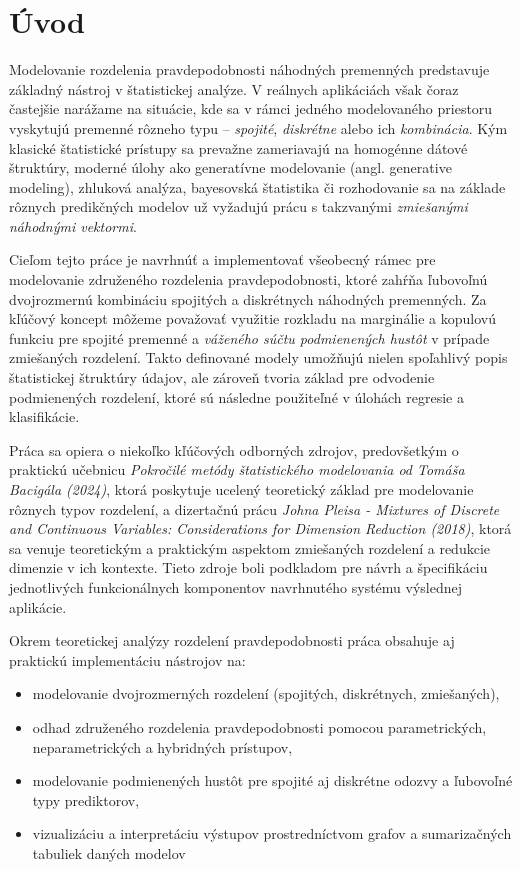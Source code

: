 \chapter{Úvod}

Modelovanie rozdelenia pravdepodobnosti náhodných premenných predstavuje základný nástroj v štatistickej analýze. V reálnych aplikáciách však čoraz častejšie narážame na situácie, kde sa v rámci jedného modelovaného priestoru vyskytujú premenné rôzneho typu – \textit{spojité}, \textit{diskrétne} alebo ich \textit{kombinácia}. Kým klasické štatistické prístupy sa prevažne zameriavajú na homogénne dátové štruktúry, moderné úlohy ako generatívne modelovanie (angl. generative modeling), zhluková analýza, bayesovská štatistika či rozhodovanie sa na základe rôznych predikčných modelov už vyžadujú prácu s takzvanými \textit{zmiešanými náhodnými vektormi}.

Cieľom tejto práce je navrhnúť a implementovať všeobecný rámec pre modelovanie združeného rozdelenia pravdepodobnosti, ktoré zahŕňa ľubovoľnú dvojrozmernú kombináciu spojitých a diskrétnych náhodných premenných. Za kľúčový koncept môžeme považovať využitie rozkladu na marginálie a kopulovú funkciu pre spojité premenné a \textit{váženého súčtu podmienených hustôt} v prípade zmiešaných rozdelení. Takto definované modely umožňujú nielen spoľahlivý popis štatistickej štruktúry údajov, ale zároveň tvoria základ pre odvodenie podmienených rozdelení, ktoré sú následne použiteľné v úlohách regresie a klasifikácie.

Práca sa opiera o niekoľko kľúčových odborných zdrojov, predovšetkým o praktickú učebnicu \textit{Pokročilé metódy štatistického modelovania od Tomáša Bacigála (2024)}\cite{bacigalPokrocileMetody}, ktorá poskytuje ucelený teoretický základ pre modelovanie rôznych typov rozdelení, a dizertačnú prácu \textit{Johna Pleisa - Mixtures of Discrete and Continuous Variables: Considerations for Dimension Reduction (2018)}\cite{pleisMixtureDissertation}, ktorá sa venuje teoretickým a praktickým aspektom zmiešaných rozdelení a redukcie dimenzie v ich kontexte. Tieto zdroje boli podkladom pre návrh a špecifikáciu jednotlivých funkcionálnych komponentov navrhnutého systému výslednej aplikácie.

Okrem teoretickej analýzy rozdelení pravdepodobnosti práca obsahuje aj praktickú implementáciu nástrojov na:

\begin{itemize}
  \item modelovanie dvojrozmerných rozdelení (spojitých, diskrétnych, zmiešaných),
  \item odhad združeného rozdelenia pravdepodobnosti pomocou parametrických, neparametrických a hybridných prístupov,
  \item modelovanie podmienených hustôt pre spojité aj diskrétne odozvy a ľubovoľné typy prediktorov,
  \item vizualizáciu a interpretáciu výstupov prostredníctvom grafov a sumarizačných tabuliek daných modelov
\end{itemize}


